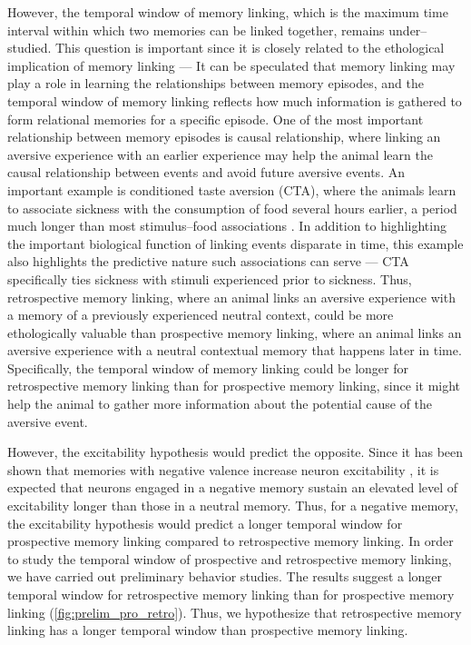 \documentclass[master.tex]{subfiles}
\begin{document}
However, the temporal window of memory linking, which is the maximum time
interval within which two memories can be linked together, remains
under--studied. This question is important since it is closely related to the
ethological implication of memory linking --- It can be speculated that memory
linking may play a role in learning the relationships between memory episodes,
and the temporal window of memory linking reflects how much information is
gathered to form relational memories for a specific episode. One of the most
important relationship between memory episodes is causal relationship, where
linking an aversive experience with an earlier experience may help the animal
learn the causal relationship between events and avoid future aversive events.
An important example is conditioned taste aversion (CTA), where the animals
learn to associate sickness with the consumption of food several hours earlier,
a period much longer than most stimulus--food associations
\cite{garcia_conditioned_1955}. In addition to highlighting the important
biological function of linking events disparate in time, this example also
highlights the predictive nature such associations can serve --- CTA
specifically ties sickness with stimuli experienced prior to sickness. Thus,
retrospective memory linking, where an animal links an aversive experience with
a memory of a previously experienced neutral context, could be more
ethologically valuable than prospective memory linking, where an animal links an
aversive experience with a neutral contextual memory that happens later in time.
Specifically, the temporal window of memory linking could be longer for
retrospective memory linking than for prospective memory linking, since it might
help the animal to gather more information about the potential cause of the
aversive event.

However, the excitability hypothesis would predict the opposite. Since it has
been shown that memories with negative valence increase neuron excitability
\cite{mckay_intrinsic_2009}, it is expected that neurons engaged in a negative
memory sustain an elevated level of excitability longer than those in a neutral
memory. Thus, for a negative memory, the excitability hypothesis would predict a
longer temporal window for prospective memory linking compared to retrospective
memory linking. In order to study the temporal window of prospective and
retrospective memory linking, we have carried out preliminary behavior studies.
The results suggest a longer temporal window for retrospective memory linking
than for prospective memory linking (\autoref{fig:prelim_pro_retro}). Thus, we
hypothesize that retrospective memory linking has a longer temporal window than
prospective memory linking.
\end{document}

